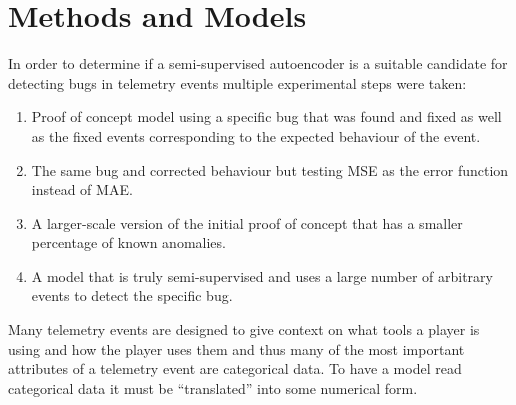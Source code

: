 \documentclass[a4paper,11pt]{article}
\begin{document}
\section{Methods and Models}
In order to determine if a semi-supervised autoencoder is a suitable candidate for detecting bugs in telemetry events multiple experimental steps were taken:
\begin{enumerate}
 \item Proof of concept model using a specific bug that was found and fixed as well as the fixed events corresponding to the expected behaviour of the event.
 \item The same bug and corrected behaviour but testing MSE as the error function instead of MAE.
 \item A larger-scale version of the initial proof of concept that has a smaller percentage of known anomalies.
 \item A model that is truly semi-supervised and uses a large number of arbitrary events to detect the specific bug.
\end{enumerate}
Many telemetry events are designed to give context on what tools a player is using and how the player uses them and thus many of the most important attributes of a telemetry event are categorical data. To have a model read categorical data it must be ``translated'' into some numerical form. 
\end{document}
